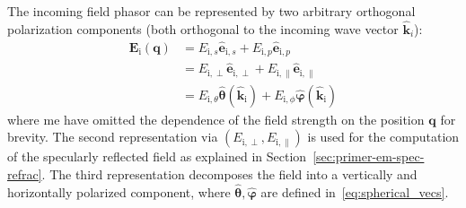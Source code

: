 The incoming field phasor can be represented by two arbitrary orthogonal polarization components (both orthogonal to the incoming wave vector $\hat{\mathbf{k}}_i$):
\begin{align}
    \mathbf{E}_\text{i}(\mathbf{q}) &= E_{\text{i},s} \hat{\mathbf{e}}_{\text{i},s} + E_{\text{i},p} \hat{\mathbf{e}}_{\text{i},p} \\
                        &= E_{\text{i},\perp} \hat{\mathbf{e}}_{\text{i},\perp} + E_{\text{i},\parallel} \hat{\mathbf{e}}_{\text{i},\parallel} \\
                        &= E_{\text{i},\theta} \hat{\boldsymbol{\theta}}(\hat{\mathbf{k}}_\text{i}) + E_{\text{i},\phi} \hat{\boldsymbol{\varphi}}(\hat{\mathbf{k}}_\text{i})
\end{align}
where me have omitted the dependence of the field strength on the position $\mathbf{q}$ for brevity.
The second representation via $(E_{\text{i},\perp}, E_{\text{i},\parallel})$ is used for the computation of the specularly reflected field as explained in Section~\ref{sec:primer-em-spec-refrac}. The third representation decomposes the field into a vertically and horizontally polarized component, where $\hat{\boldsymbol{\theta}}, \hat{\boldsymbol{\varphi}}$ are defined in~\eqref{eq:spherical_vecs}.

